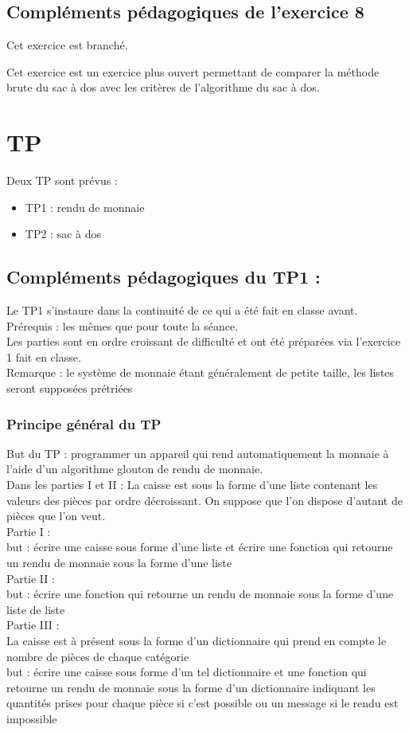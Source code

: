 \documentclass[12pt,french]{report}
\begin{document}
\section{Compléments pédagogiques de l'exercice 8}
\begin{center} Cet exercice est branché. \end{center}
Cet exercice est un exercice plus ouvert permettant de comparer la méthode brute du sac à dos avec les critères de l'algorithme du sac à dos.



\chapter{TP}
Deux TP sont prévus :
\begin{itemize}
	\item TP1 : rendu de monnaie
	\item TP2 : sac à dos
\end{itemize}

\section{Compléments pédagogiques du TP1 :}
Le TP1 s'instaure dans la continuité de ce qui a été fait en classe avant.\\
Prérequis : les mêmes que pour toute la séance.\\
Les parties sont en ordre croissant de difficulté et ont été préparées via l'exercice 1 fait en classe.\\
Remarque : le système de monnaie étant généralement de petite taille, les listes seront supposées prétriées 
\medskip
\subsection{Principe général du TP }
But du TP : programmer un appareil qui rend automatiquement la monnaie à l'aide d'un algorithme glouton de rendu de monnaie.\\
Dans les parties I et II : La caisse est sous la forme d'une liste contenant les valeurs des pièces par ordre décroissant. On suppose que l'on dispose d'autant de pièces que l'on veut.\\ 
Partie I : \\
but : écrire une caisse sous forme d'une liste et écrire une fonction qui retourne un rendu de monnaie sous la forme d'une liste \\
Partie II : \\
but : écrire une fonction qui retourne un rendu de monnaie sous la forme d'une liste de liste\\
Partie III : \\
La caisse est à présent sous la forme d'un dictionnaire qui prend en compte le nombre de pièces de chaque catégorie\\
but : écrire une caisse sous forme d'un tel dictionnaire et une fonction qui retourne un rendu de monnaie sous la forme d'un dictionnaire indiquant les quantités prises pour chaque pièce si c'est possible ou un message si le rendu est impossible \\
\end{document}
